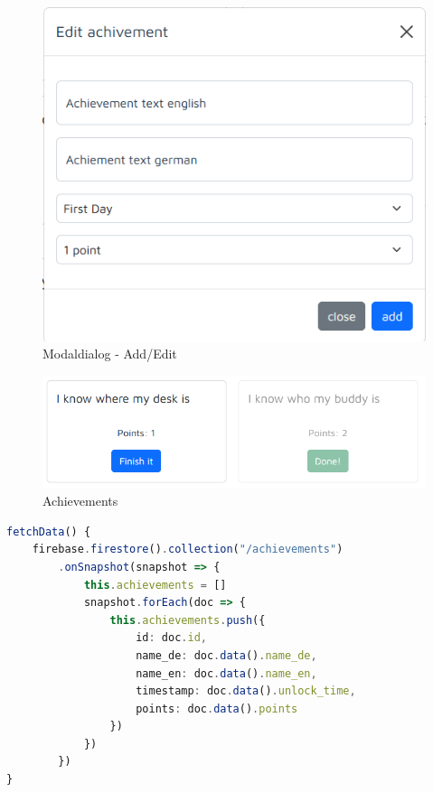 \documentclass[11pt]{article}
\begin{document}
\begin{figure}
    \centering
    \includegraphics{application/popup_manage.png}
    \caption{Modaldialog - Add/Edit}
    \label{abb:modal}
\end{figure}

\begin{figure} %
    \centering
    \includegraphics[width=\textwidth]{application/achievement_done_undone.png}
    \caption{Achievements}
    \label{abb:achievements}
\end{figure}

\clearpage

\begin{lstlisting}[language=TypeScript, caption=Lade Daten Beispiel]
fetchData() {
    firebase.firestore().collection("/achievements")
        .onSnapshot(snapshot => {
            this.achievements = []
            snapshot.forEach(doc => {
                this.achievements.push({
                    id: doc.id,
                    name_de: doc.data().name_de,
                    name_en: doc.data().name_en,
                    timestamp: doc.data().unlock_time,
                    points: doc.data().points
                })
            })
        })
}
\end{lstlisting}
\end{document}
